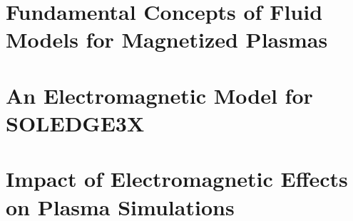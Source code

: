 \documentclass[english]{amu_these}
\begin{document}
	
										





	\tableofcontents					%
	\listoffigures						%
	\listoftables						%
	\printglossary[						%
		type=\acronymtype,
		title={List of acronymes},
		toctitle={List of acronymes}
		]
	\printglossary[						%
		title={Glossary},
		toctitle={Glossary}
		]
	\printglossary[						%
		type=notation,
		title={Naming convention},
		toctitle={Naming convention}
		]

	\ohead{\leftmark\Ifstr{\rightmark}{\leftmark}{}{ -- \rightmark}}	%
	
	\clearpage
	
	
	
	\part[Fundamental Concepts of Fluid Models for Magnetized Plasmas]{Fundamental Concepts of Fluid Models for Magnetized Plasmas}
	\label{part:FundamentalsPlasmaSimulations}
	
	
	

	\part[An Electromagnetic Model for SOLEDGE3X]{An Electromagnetic Model for SOLEDGE3X}
	\label{part:ElectromagneticModel}
	
	
	
	
	\part[Impact of Electromagnetic Effects on Plasma Simulations]{Impact of Electromagnetic Effects on Plasma Simulations}
	\label{part:EM_Impact}
	
	
	

	

	\appendix

	\newpage
	\printbibliography[heading=bibintoc] %
	
	\newpage
	\printindex							%
	
	\newpage
	\printendnotes						%

\end{document}
